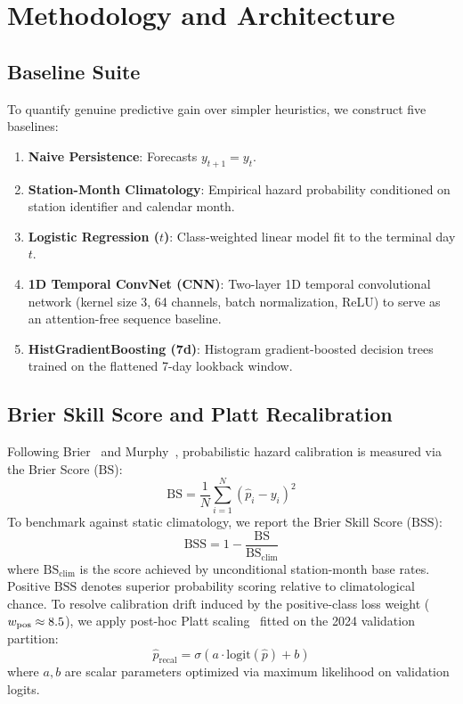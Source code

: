 \documentclass[conference]{IEEEtran}
\begin{document}
\section{Methodology and Architecture}
\label{sec:method}
\subsection{Baseline Suite}
To quantify genuine predictive gain over simpler heuristics, we construct five baselines:
\begin{enumerate}
    \item \textbf{Naive Persistence}: Forecasts $y_{t+1} = y_t$.
    \item \textbf{Station-Month Climatology}: Empirical hazard probability conditioned on station identifier and calendar month.
    \item \textbf{Logistic Regression ($t$)}: Class-weighted linear model fit to the terminal day $t$.
    \item \textbf{1D Temporal ConvNet (CNN)}: Two-layer 1D temporal convolutional network (kernel size 3, 64 channels, batch normalization, ReLU) to serve as an attention-free sequence baseline.
    \item \textbf{HistGradientBoosting (7d)}: Histogram gradient-boosted decision trees trained on the flattened 7-day lookback window.
\end{enumerate}

\subsection{Brier Skill Score and Platt Recalibration}
Following Brier~\cite{brier1950} and Murphy~\cite{murphy1973}, probabilistic hazard calibration is measured via the Brier Score ($\text{BS}$):
\begin{equation}
\text{BS} = \frac{1}{N} \sum_{i=1}^N (\hat{p}_i - y_i)^2
\end{equation}
To benchmark against static climatology, we report the Brier Skill Score ($\text{BSS}$):
\begin{equation}
\text{BSS} = 1 - \frac{\text{BS}}{\text{BS}_{\text{clim}}}
\end{equation}
where $\text{BS}_{\text{clim}}$ is the score achieved by unconditional station-month base rates. Positive $\text{BSS}$ denotes superior probability scoring relative to climatological chance. To resolve calibration drift induced by the positive-class loss weight ($w_{\text{pos}} \approx 8.5{}$), we apply post-hoc Platt scaling~\cite{platt1999,wilks2011} fitted on the 2024 validation partition:
\begin{equation}
\hat{p}_{\text{recal}} = \sigma\left( a \cdot \text{logit}(\hat{p}) + b \right)
\end{equation}
where $a, b$ are scalar parameters optimized via maximum likelihood on validation logits.
\end{document}
